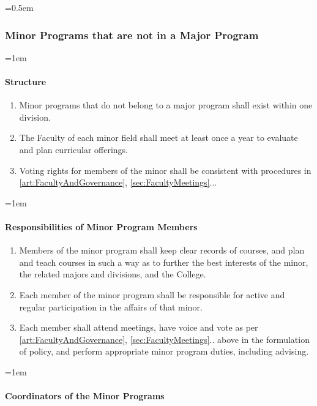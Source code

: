 \documentclass{manual}
\let\oldsubsubsection\subsubsection
\renewcommand\subsubsection{\leftskip=0.5em\oldsubsubsection}
\let\oldparagraph\paragraph
\renewcommand\paragraph{\leftskip=1em\oldparagraph}
\newcommand{\itemLevelA}{\alph*.}
\newcommand{\itemRefA}{\alph*}
\begin{document}
		\subsubsection{Minor Programs that are not in a Major Program}

			\paragraph{Structure}

				\begin{enumerate}[label=\itemLevelA,ref=\itemRefA]
				\item Minor programs that do not belong to a major program shall exist within one division.
				\item The Faculty of each minor field shall meet at least once a year to evaluate and plan curricular offerings. 
				\item Voting rights for members of the minor shall be consistent with procedures in \cref{art:FacultyAndGovernance}, \cref{sec:FacultyMeetings}...
				\end{enumerate}

			\paragraph{Responsibilities of Minor Program Members}

				\begin{enumerate}[label=\itemLevelA,ref=\itemRefA]
				\item Members of the minor program shall keep clear records of courses, and plan and teach courses in such a way as to further the best interests of the minor, the related majors and divisions, and the College.
				\item Each member of the minor program shall be responsible for active and regular participation in the affairs of that minor.
				\item Each member shall attend meetings, have voice and vote as per \cref{art:FacultyAndGovernance}, \cref{sec:FacultyMeetings}.. above in the formulation of policy, and perform appropriate minor program duties, including advising.
				\end{enumerate}

			\paragraph{Coordinators of the Minor Programs}
\end{document}
